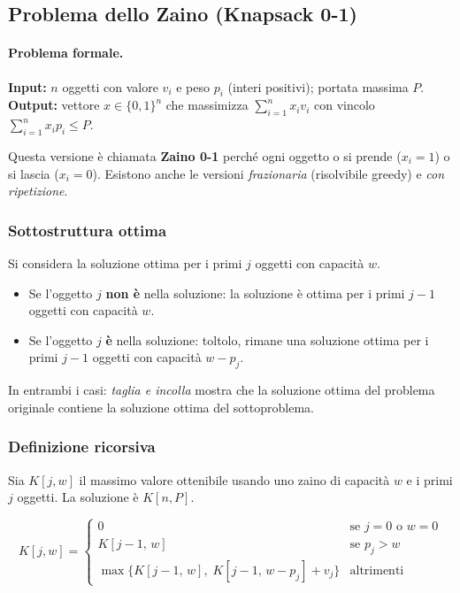 \subsection{Problema dello Zaino (Knapsack 0-1)}

\paragraph{Problema formale.}
\textbf{Input:} $n$ oggetti con valore $v_i$ e peso $p_i$ (interi positivi);
portata massima $P$.
\textbf{Output:} vettore $x \in \{0,1\}^n$ che massimizza
$\sum_{i=1}^n x_i v_i$ con vincolo $\sum_{i=1}^n x_i p_i \leq P$.

\begin{nota}
Questa versione è chiamata \textbf{Zaino 0-1} perché ogni oggetto o si prende
($ x_i = 1$) o si lascia ($x_i = 0$). Esistono anche le versioni \emph{frazionaria}
(risolvibile greedy) e \emph{con ripetizione}.
\end{nota}

\subsubsection{Sottostruttura ottima}

Si considera la soluzione ottima per i primi $j$ oggetti con capacità $w$.
\begin{itemize}
\item Se l'oggetto $j$ \textbf{non è} nella soluzione: la soluzione è ottima per
i primi $j-1$ oggetti con capacità $w$.
\item Se l'oggetto $j$ \textbf{è} nella soluzione: toltolo, rimane una soluzione
ottima per i primi $j-1$ oggetti con capacità $w - p_j$.
\end{itemize}
In entrambi i casi: \emph{taglia e incolla} mostra che la soluzione ottima del
problema originale contiene la soluzione ottima del sottoproblema.

\subsubsection{Definizione ricorsiva}

Sia $K[j,w]$ il massimo valore ottenibile usando uno zaino di capacità $w$ e i
primi $j$ oggetti. La soluzione è $K[n, P]$.

\[
K[j,w] =
\begin{cases}
0 & \text{se } j = 0 \text{ o } w = 0 \\
K[j-1,\, w] & \text{se } p_j > w \\
\max\!\bigl\{K[j-1,\, w],\; K[j-1,\, w-p_j]+v_j\bigr\} & \text{altrimenti}
\end{cases}
\]

